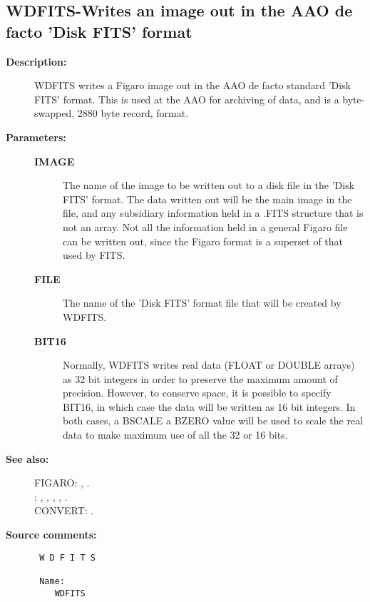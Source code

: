 \subsection{WDFITS-\label{WDFITS}Writes an image out in the AAO de facto 'Disk FITS' format}
\begin{description}

\item [{\bf Description:}]
 WDFITS writes a Figaro image out in the AAO de facto standard
 'Disk FITS' format.  This is used at the AAO for archiving of
 data, and is a byte-swapped, 2880 byte record, format.

\item [{\bf Parameters:}]
\begin{description}
\item [{\bf IMAGE}]
 The name of the image to be written out to
 a disk file in the 'Disk FITS' format.  The data
 written out will be the main image in the file, and
 any subsidiary information held in a .FITS structure
 that is not an array.  Not all the information held in
 a general Figaro file can be written out, since the
 Figaro format is a superset of that used by FITS.
\item [{\bf FILE}]
 The name of the 'Disk FITS' format file that
 will be created by WDFITS.
\item [{\bf BIT16}]
 Normally, WDFITS writes real data (FLOAT or DOUBLE arrays)
 as 32 bit integers in order to preserve the maximum
 amount of precision.  However, to conserve space, it is
 possible to specify BIT16, in which case the data will
 be written as 16 bit integers.  In both cases, a BSCALE
 a BZERO value will be used to scale the real data to make
 maximum use of all the 32 or 16 bits.
\end{description}

\item [{\bf See also:}]
FIGARO: , .\\
: , , , , .\\
CONVERT: .\\

\item [{\bf Source comments:}]
\begin{verbatim}
 W D F I T S

 Name:
    WDFITS


\end{verbatim}
\end{description}
